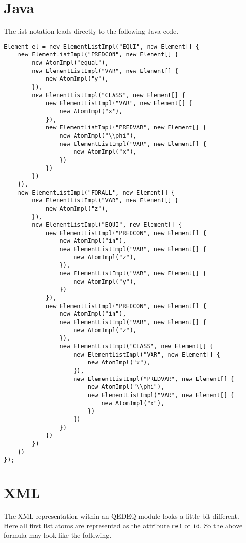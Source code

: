 \documentclass[a4paper,german,10pt,twoside]{book}
\theoremstyle{definition}
\theoremstyle{remark}
\begin{document}
\section{Java} \label{chapter4_section2} \hypertarget{chapter4_section2}{}
The list notation leads directly to the following Java code.
\begin{verbatim}
Element el = new ElementListImpl("EQUI", new Element[] {
    new ElementListImpl("PREDCON", new Element[] {
        new AtomImpl("equal"), 
        new ElementListImpl("VAR", new Element[] {
            new AtomImpl("y"), 
        }),
        new ElementListImpl("CLASS", new Element[] {
            new ElementListImpl("VAR", new Element[] {
                new AtomImpl("x"), 
            }),
            new ElementListImpl("PREDVAR", new Element[] {
                new AtomImpl("\\phi"), 
                new ElementListImpl("VAR", new Element[] {
                    new AtomImpl("x"), 
                })
            })
        })
    }),
    new ElementListImpl("FORALL", new Element[] {
        new ElementListImpl("VAR", new Element[] {
            new AtomImpl("z"), 
        }),
        new ElementListImpl("EQUI", new Element[] {
            new ElementListImpl("PREDCON", new Element[] {
                new AtomImpl("in"), 
                new ElementListImpl("VAR", new Element[] {
                    new AtomImpl("z"), 
                }),
                new ElementListImpl("VAR", new Element[] {
                    new AtomImpl("y"), 
                })
            }),
            new ElementListImpl("PREDCON", new Element[] {
                new AtomImpl("in"), 
                new ElementListImpl("VAR", new Element[] {
                    new AtomImpl("z"), 
                }),
                new ElementListImpl("CLASS", new Element[] {
                    new ElementListImpl("VAR", new Element[] {
                        new AtomImpl("x"), 
                    }),
                    new ElementListImpl("PREDVAR", new Element[] {
                        new AtomImpl("\\phi"), 
                        new ElementListImpl("VAR", new Element[] {
                            new AtomImpl("x"), 
                        })
                    })
                })
            })
        })
    })
});

\end{verbatim}

\section{XML} \label{chapter4_section3} \hypertarget{chapter4_section3}{}
The XML representation within an QEDEQ module looks a little bit different. Here all first list atoms are represented as the attribute {\tt ref} or {\tt id}.
So the above formula may look like the following.
\end{document}

